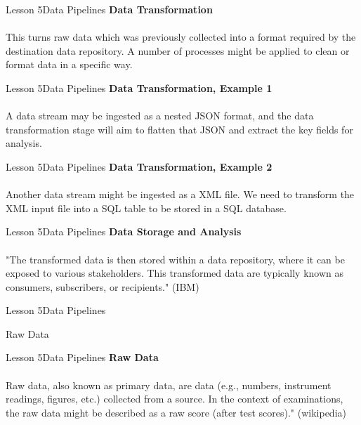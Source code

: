 \documentclass[aspectratio=1610]{beamer}
\begin{document}
\begin{frame}{Lesson 5}{Data Pipelines}
\LARGE
\textbf{Data Transformation}\\~\\
This turns raw data which was previously collected into a format required by 
the destination data repository. A number of processes might be applied to 
clean or format data in a specific way.
\end{frame}



\begin{frame}{Lesson 5}{Data Pipelines}
\LARGE
\textbf{Data Transformation, Example 1}\\~\\
A data stream may be ingested as a nested JSON format, and the data 
transformation stage will aim to flatten that JSON and extract the
key fields for analysis.
\end{frame}


\begin{frame}{Lesson 5}{Data Pipelines}
\LARGE
\textbf{Data Transformation, Example 2}\\~\\
Another data stream might be ingested as a XML file. We need to 
transform the XML input file into a SQL table to be stored in a SQL
database.
\end{frame}



\begin{frame}{Lesson 5}{Data Pipelines}
\LARGE
\textbf{Data Storage and Analysis}\\~\\
"The transformed data is then stored within a data repository, where
it can be exposed to various stakeholders. This transformed data are
typically known as consumers, subscribers, or recipients." (IBM)
\end{frame}



\begin{frame}{Lesson 5}{Data Pipelines}
\Huge
\begin{center}
Raw Data
\end{center}
\end{frame}


\begin{frame}{Lesson 5}{Data Pipelines}
\LARGE
\textbf{Raw Data}\\~\\
Raw data, also known as primary data, are data (e.g., numbers, 
instrument readings, figures, etc.) collected from a source. In the 
context of examinations, the raw data might be described as a raw 
score (after test scores)." (wikipedia)
\end{frame}
\end{document}
